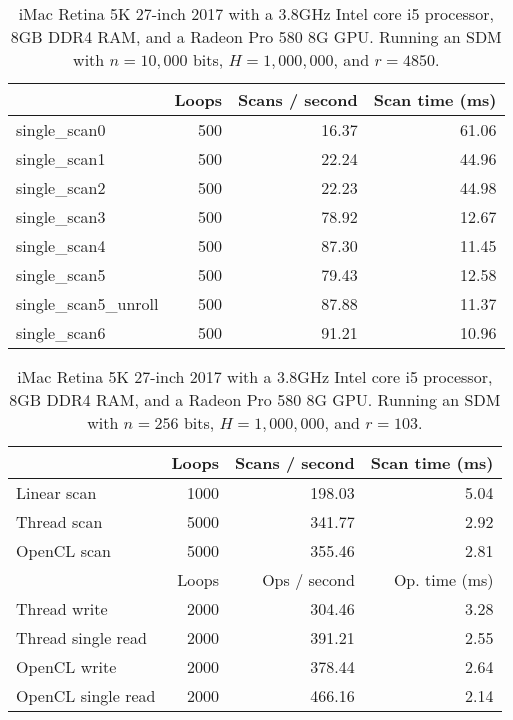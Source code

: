\begin{table}[!htb]
\centering
\begin{tabular}{| l | r | r | r |}
    \hline
    & Loops & Scans / second & Scan time (ms) \\ \hline
    single\_scan0 & 500 & 16.37 & 61.06 \\
    single\_scan1 & 500 & 22.24 & 44.96 \\
    single\_scan2 & 500 & 22.23 & 44.98 \\
    single\_scan3 & 500 & 78.92 & 12.67 \\
    single\_scan4 & 500 & 87.30 & 11.45 \\
    single\_scan5 & 500 & 79.43 & 12.58 \\
    single\_scan5\_unroll & 500 & 87.88 & 11.37 \\
    single\_scan6 & 500 & 91.21 & 10.96 \\
    \hline
\end{tabular}
\caption{iMac Retina 5K 27-inch 2017 with a 3.8GHz Intel core i5 processor, 8GB DDR4 RAM, and a Radeon Pro 580 8G GPU. Running an SDM with $n=10,000$ bits, $H=1,000,000$, and $r=4850$.
\label{tab:perf-imac-kernels-10k}}
\end{table}

\begin{table}[!htb]
\centering
\begin{tabular}{| l | r | r | r |}
    \hline
    & Loops & Scans / second & Scan time (ms) \\ \hline
    Linear scan & 1000 & 198.03 & 5.04 \\
    Thread scan & 5000 & 341.77 & 2.92 \\
    OpenCL scan & 5000 & 355.46 & 2.81 \\ \hline
    \hline
    & Loops & Ops / second & Op. time (ms) \\ \hline
    Thread write & 2000 & 304.46 & 3.28 \\
    Thread single read & 2000 & 391.21 & 2.55 \\
    OpenCL write & 2000 & 378.44 & 2.64 \\
    OpenCL single read & 2000 & 466.16 & 2.14 \\
    \hline
\end{tabular}
\caption{iMac Retina 5K 27-inch 2017 with a 3.8GHz Intel core i5 processor, 8GB DDR4 RAM, and a Radeon Pro 580 8G GPU. Running an SDM with $n=256$ bits, $H=1,000,000$, and $r=103$.
\label{tab:perf-imac-256}}
\end{table}

